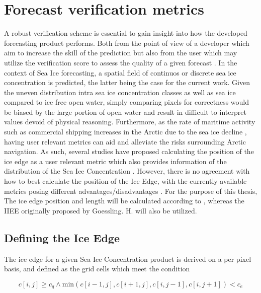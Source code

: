 \documentclass[../main/thesis.tex]{subfiles}
\begin{document}
\section{Forecast verification metrics}
A robust verification scheme is essential to gain insight into how the developed forecasting product performs. Both from the point of view of a  developer which aim to increase the skill of the prediction but also from the user which may utilize the verification score to assess the quality of a given forecast \cite{Casati2008}. In the context of Sea Ice forecasting, a spatial field of continuos or discrete sea ice concentration is predicted, the latter being the case for the current work. Given the uneven distribution intra sea ice concentration classes as well as sea ice compared to ice free open water, simply comparing pixels for correctness would be biased by the large portion of open water and result in difficult to interpret values devoid of physical reasoning.  Furthermore, as the rate of maritime activity such as commercial shipping increases in the Arctic due to the sea ice decline \cite{Ho2010}, having user relevant metrics can aid and alleviate the risks surrounding Arctic navigation. As such, several studies have proposed calculating the position of the ice edge as a user relevant metric which also provides information of the distribution of the Sea Ice Concentration \cite{Dukhovskoy2015,Goessling2016,Goessling2018}. However, there is no agreement with how to best calculate the position of the Ice Edge, with the currently available metrics posing different advantages/disadvantages \cite{Palerme2019,Melsom2019}. For the purpose of this thesis, The ice edge position and length will be calculated according to \cite[Melsom 2019 et.al]{Melsom2019}, whereas the IIEE originally proposed by Goessling. H. \cite{Goessling2016} will also be utilized.

\subsection{Defining the Ice Edge}
\label{sec:iceedgelength}
The ice edge for a given Sea Ice Concentration product is derived on a per pixel basis, and defined as the grid cells which meet the condition

\begin{equation}
    \label{eq:iceedge}
    c[i,j] \geq c_q \wedge \text{min}{(c[i-1,j],c[i+1,j],c[i,j-1],c[i,j+1])} < c_e
\end{equation}
\end{document}
